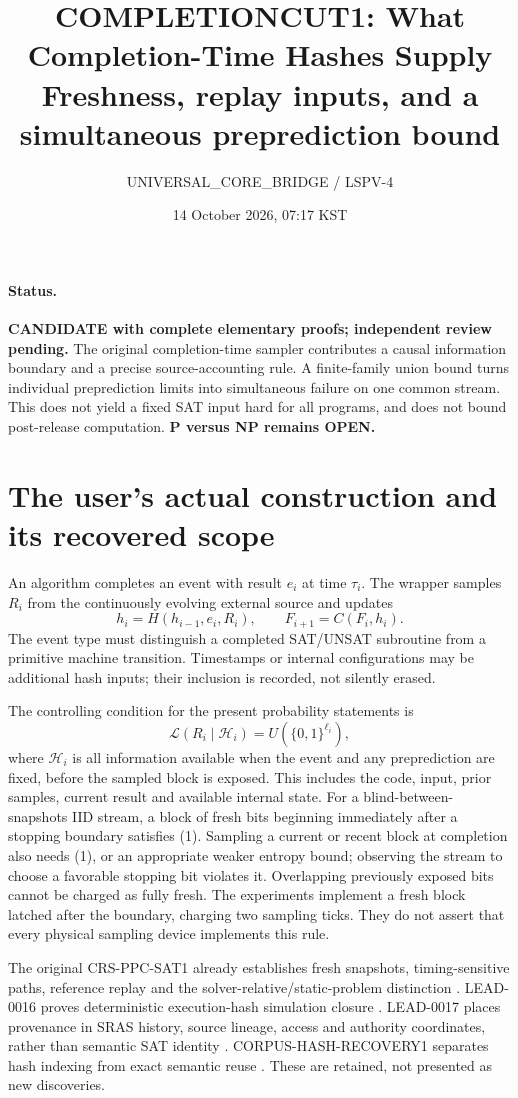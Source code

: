 \documentclass[11pt]{article}
\title{COMPLETIONCUT1: What Completion-Time Hashes Supply\\
\large Freshness, replay inputs, and a simultaneous preprediction bound}
\author{UNIVERSAL\_CORE\_BRIDGE / LSPV-4}
\date{14 October 2026, 07:17 KST}
\begin{document}
\maketitle
\paragraph{Status.}
\textbf{CANDIDATE with complete elementary proofs; independent review pending.}
The original completion-time sampler contributes a causal information boundary
and a precise source-accounting rule. A finite-family union bound turns
individual preprediction limits into simultaneous failure on one common stream.
This does not yield a fixed SAT input hard for all programs, and does not
bound post-release computation. \textbf{P versus NP remains OPEN.}

\section{The user's actual construction and its recovered scope}
An algorithm completes an event with result $e_i$ at time $\tau_i$. The wrapper
samples $R_i$ from the continuously evolving external source and updates
\[
 h_i=H(h_{i-1},e_i,R_i),\qquad F_{i+1}=C(F_i,h_i).
\]
The event type must distinguish a completed SAT/UNSAT subroutine from a
primitive machine transition. Timestamps or internal configurations may be
additional hash inputs; their inclusion is recorded, not silently erased.

The controlling condition for the present probability statements is
\[
 \mathcal L(R_i\mid\mathcal H_i)=U(\{0,1\}^{\ell_i}),       \tag{1}
\]
where $\mathcal H_i$ is all information available when the event and any
preprediction are fixed, before the sampled block is exposed. This includes
the code, input, prior samples, current result and available internal state.
For a blind-between-snapshots IID stream, a block of fresh bits beginning
immediately after a stopping boundary satisfies (1). Sampling a current or
recent block at completion also needs (1), or an appropriate weaker entropy
bound; observing the stream to choose a favorable stopping bit violates it.
Overlapping previously exposed bits cannot be charged as fully fresh.
The experiments implement a fresh block latched after the boundary, charging
two sampling ticks. They do not assert that every physical sampling device
implements this rule.

The original CRS-PPC-SAT1 already establishes fresh snapshots, timing-sensitive
paths, reference replay and the solver-relative/static-problem distinction
\cite{crs}. LEAD-0016 proves deterministic execution-hash simulation closure
\cite{lead16}. LEAD-0017 places provenance in SRAS history, source lineage,
access and authority coordinates, rather than semantic SAT identity
\cite{lead17}. CORPUS-HASH-RECOVERY1 separates hash indexing from exact semantic
reuse \cite{recovery}. These are retained, not presented as new discoveries.
\end{document}
